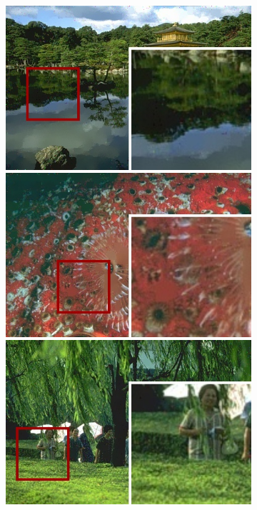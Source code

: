 \begin{figure}[!ht]
\begin{subfigure}[]{0.22\textwidth}
    \includegraphics[width=\textwidth]{./figures/sensor/berkeley/65010_edgefilter_frame.jpg}\vspace{0.1cm}\\
    \includegraphics[width=\textwidth]{./figures/sensor/berkeley/12084_edgefilter_frame.jpg}\vspace{0.1cm}\\
    \includegraphics[width=\textwidth]{./figures/sensor/berkeley/65033_edgefilter_frame.jpg}\vspace{0.1cm}\\

\end{subfigure}
\end{figure}
